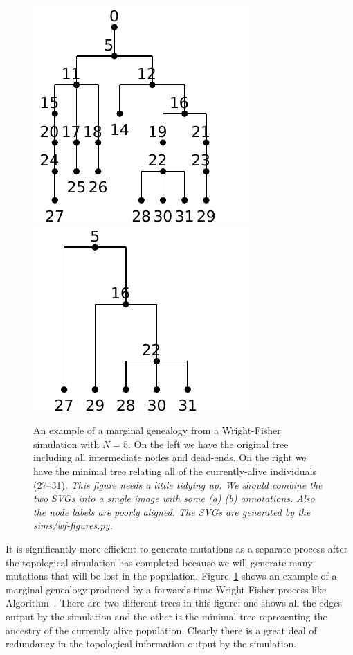 \documentclass{article}
\newcommand{\jk}[1]{{\em \color{red} #1}}
\begin{document}
\begin{figure}
    \begin{center}
        \includegraphics{sims/wf-before}
        \includegraphics{sims/wf-after}
    \end{center}
    \caption{An example of a marginal genealogy from a Wright-Fisher simulation
    with $N=5$. On the left we have the original tree including all
    intermediate nodes and dead-ends. On the right we have the minimal tree
    relating all of the currently-alive individuals (27--31).
    \jk{This figure needs a little tidying up. We should combine the two SVGs
        into a single image with some (a) (b) annotations. Also the node labels
        are poorly aligned. The SVGs are generated by the sims/wf-figures.py.}
    \label{fig:wf-trees}
    }
\end{figure}

It is significantly more efficient to generate mutations as a separate process
after the topological simulation has completed because we will generate many
mutations that will be lost in the population. Figure~\ref{fig:wf-trees} shows
an example of a marginal genealogy produced by a forwards-time Wright-Fisher
process like Algorithm~. There are two different trees in this
figure: one shows all the edges output by the simulation and the other
is the minimal tree representing the ancestry of the currently alive
population. Clearly there is a great deal of redundancy in the topological
information output by the simulation.
\end{document}
